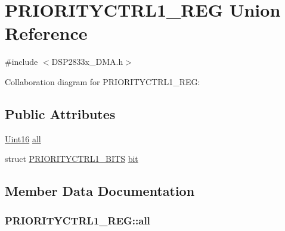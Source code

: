 \hypertarget{union_p_r_i_o_r_i_t_y_c_t_r_l1___r_e_g}{}\section{P\+R\+I\+O\+R\+I\+T\+Y\+C\+T\+R\+L1\+\_\+\+R\+E\+G Union Reference}
\label{union_p_r_i_o_r_i_t_y_c_t_r_l1___r_e_g}


{\ttfamily \#include $<$D\+S\+P2833x\+\_\+\+D\+M\+A.\+h$>$}



Collaboration diagram for P\+R\+I\+O\+R\+I\+T\+Y\+C\+T\+R\+L1\+\_\+\+R\+E\+G\+:
\subsection*{Public Attributes}
\begin{DoxyCompactItemize}
\item 
\hyperlink{_d_s_p2833x___device_8h_a59a9f6be4562c327cbfb4f7e8e18f08b}{Uint16} \hyperlink{union_p_r_i_o_r_i_t_y_c_t_r_l1___r_e_g_a3a960909431b57184e73e4704aee90c4}{all}
\item 
struct \hyperlink{struct_p_r_i_o_r_i_t_y_c_t_r_l1___b_i_t_s}{P\+R\+I\+O\+R\+I\+T\+Y\+C\+T\+R\+L1\+\_\+\+B\+I\+T\+S} \hyperlink{union_p_r_i_o_r_i_t_y_c_t_r_l1___r_e_g_aefd58a64e6f30371404d82a13bbfc2b1}{bit}
\end{DoxyCompactItemize}


\subsection{Member Data Documentation}
\hypertarget{union_p_r_i_o_r_i_t_y_c_t_r_l1___r_e_g_a3a960909431b57184e73e4704aee90c4}{}
\subsubsection[{all}]{ P\+R\+I\+O\+R\+I\+T\+Y\+C\+T\+R\+L1\+\_\+\+R\+E\+G\+::all}\label{union_p_r_i_o_r_i_t_y_c_t_r_l1___r_e_g_a3a960909431b57184e73e4704aee90c4}
\hypertarget{union_p_r_i_o_r_i_t_y_c_t_r_l1___r_e_g_aefd58a64e6f30371404d82a13bbfc2b1}{}
